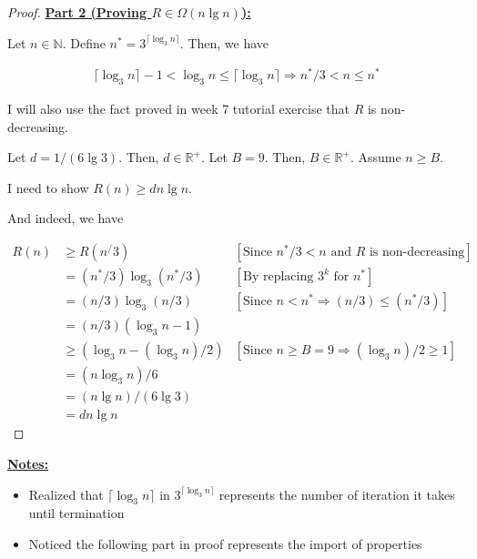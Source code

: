 \documentclass[12pt]{article}
\begin{document}
\begin{itemize}
\begin{proof}
    \bigskip

    \underline{\textbf{Part 2 (Proving $R \in \Omega(n \lg n)$):}}

    \bigskip

    Let $n \in \mathbb{N}$. Define $n^* = 3^{\lceil \log_3 n \rceil}$.
    Then, we have

    \begin{align}
        \lceil \log_3 n \rceil - 1 < \log_3 n \leq \lceil \log_3 n \rceil \Rightarrow n^*/3 < n \leq n^*
    \end{align}

    \bigskip

    I will also use the fact proved in week 7 tutorial exercise that
    $R$ is non-decreasing.

    \bigskip

    Let $d = 1/(6\lg 3)$. Then, $d \in \mathbb{R}^+$. Let $B = 9$. Then, $B \in \mathbb{R}^+$.
    Assume $n \geq B$.

    \bigskip

    I need to show $R(n) \geq dn\lg n$.

    \bigskip

    And indeed, we have

    \begin{align}
        R(n)&\geq R(n^/3) & [\text{Since $n^*/3 < n$ and $R$ is non-decreasing}]\\
        &= (n^*/3)\log_3 (n^*/3) & [\text{By replacing $3^k$ for $n^*$}]\\
        &= (n/3)\log_3 (n/3) & [\text{Since $n < n^* \Rightarrow (n/3) \leq (n^*/3)$}]\\
        &= (n/3)(\log_3 n - 1)\\
        &\geq (\log_3 n - (\log_3 n)/2)& [\text{Since $n \geq B = 9 \Rightarrow (\log_3 n)/2 \geq 1$}]\\
        &= (n\log_3 n)/6\\
        &= (n\lg n)/(6\lg 3)\\
        &= dn\lg n
    \end{align}

    \end{proof}

    \bigskip

    \underline{\textbf{Notes:}}

    \bigskip

    \begin{itemize}
        \item Realized that $\lceil \log_3 n \rceil$ in $3^{\lceil \log_3 n \rceil}$
        represents the number of iteration it takes until termination
        \item Noticed the following part in proof represents the import of properties


\end{itemize}
\end{itemize}
\end{document}
